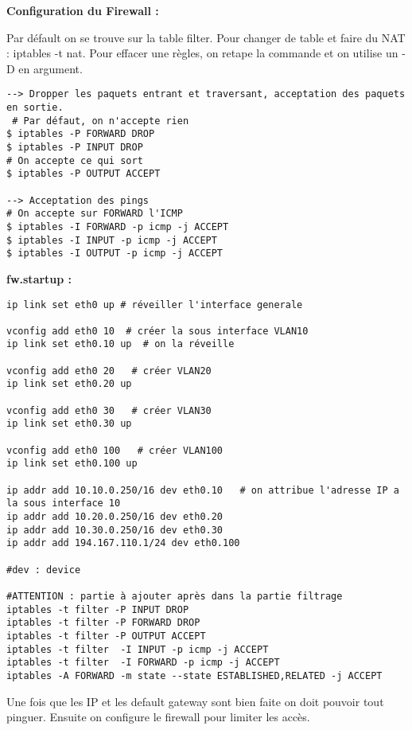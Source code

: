 \documentclass[a4paper]{article}
\begin{document}
\textbf{Configuration du Firewall : }

Par défault on se trouve sur la table filter. Pour changer de table et faire du NAT : iptables -t nat. Pour effacer une règles, on retape la commande et on utilise un -D en argument. \\

\begin{verbatim}
--> Dropper les paquets entrant et traversant, acceptation des paquets en sortie. 
 # Par défaut, on n'accepte rien
$ iptables -P FORWARD DROP
$ iptables -P INPUT DROP
# On accepte ce qui sort
$ iptables -P OUTPUT ACCEPT 

--> Acceptation des pings
# On accepte sur FORWARD l'ICMP
$ iptables -I FORWARD -p icmp -j ACCEPT
$ iptables -I INPUT -p icmp -j ACCEPT
$ iptables -I OUTPUT -p icmp -j ACCEPT

\end{verbatim}

\noindent
\textbf{fw.startup  :}
	
\begin{verbatim}
ip link set eth0 up # réveiller l'interface generale

vconfig add eth0 10  # créer la sous interface VLAN10
ip link set eth0.10 up  # on la réveille

vconfig add eth0 20   # créer VLAN20
ip link set eth0.20 up

vconfig add eth0 30   # créer VLAN30
ip link set eth0.30 up

vconfig add eth0 100   # créer VLAN100
ip link set eth0.100 up

ip addr add 10.10.0.250/16 dev eth0.10   # on attribue l'adresse IP a la sous interface 10
ip addr add 10.20.0.250/16 dev eth0.20
ip addr add 10.30.0.250/16 dev eth0.30
ip addr add 194.167.110.1/24 dev eth0.100

#dev : device

#ATTENTION : partie à ajouter après dans la partie filtrage
iptables -t filter -P INPUT DROP
iptables -t filter -P FORWARD DROP
iptables -t filter -P OUTPUT ACCEPT
iptables -t filter  -I INPUT -p icmp -j ACCEPT
iptables -t filter  -I FORWARD -p icmp -j ACCEPT
iptables -A FORWARD -m state --state ESTABLISHED,RELATED -j ACCEPT
\end{verbatim}	
		
Une fois que les IP et les default gateway sont bien faite on doit pouvoir tout pinguer. Ensuite on configure le firewall pour limiter les accès. \\
\end{document}
